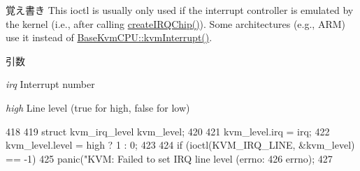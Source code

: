 \begin{DoxyNote}{覚え書き}
This ioctl is usually only used if the interrupt controller is emulated by the kernel (i.e., after calling \hyperlink{group__KvmInterrupts_ga75f1140369bf3942bb93a75d1b3de2c9}{createIRQChip()}). Some architectures (e.g., ARM) use it instead of \hyperlink{group__KvmInterrupts_ga16b8f95e3f70098952604e6b8a121679}{BaseKvmCPU::kvmInterrupt()}.
\end{DoxyNote}

\begin{DoxyParams}{引数}
\item[{\em irq}]Interrupt number \item[{\em high}]Line level (true for high, false for low) \end{DoxyParams}



\begin{DoxyCode}
418 {
419     struct kvm_irq_level kvm_level;
420 
421     kvm_level.irq = irq;
422     kvm_level.level = high ? 1 : 0;
423 
424     if (ioctl(KVM_IRQ_LINE, &kvm_level) == -1)
425         panic("KVM: Failed to set IRQ line level (errno: %
426               errno);
427 }
\end{DoxyCode}
